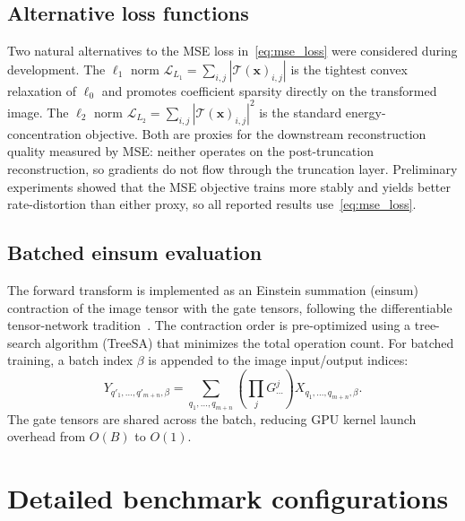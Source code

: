 \documentclass[a4paper, twocolumn]{quantumarticle}
\newcommand{\TT}{\mathcal{T}}
\newcommand{\LL}{\mathcal{L}}
\begin{document}
\subsection{Alternative loss functions}
\label{app:alt_losses}

Two natural alternatives to the MSE loss in~\cref{eq:mse_loss} were considered during development.
The $\ell_1$ norm $\LL_{L_1} = \sum_{i,j} |\TT(\mathbf{x})_{i,j}|$ is the tightest convex relaxation of $\ell_0$ and promotes coefficient sparsity directly on the transformed image.
The $\ell_2$ norm $\LL_{L_2} = \sum_{i,j} |\TT(\mathbf{x})_{i,j}|^2$ is the standard energy-concentration objective.
Both are proxies for the downstream reconstruction quality measured by MSE: neither operates on the post-truncation reconstruction, so gradients do not flow through the truncation layer.
Preliminary experiments showed that the MSE objective trains more stably and yields better rate-distortion than either proxy, so all reported results use~\cref{eq:mse_loss}.

\subsection{Batched einsum evaluation}
\label{app:einsum}

The forward transform is implemented as an Einstein summation (einsum) contraction of the image tensor with the gate tensors, following the differentiable tensor-network tradition~\cite{liao2019differentiable}.
The contraction order is pre-optimized using a tree-search algorithm (TreeSA) that minimizes the total operation count.
For batched training, a batch index $\beta$ is appended to the image input/output indices:
\begin{equation}
  Y_{q'_1, \ldots, q'_{m+n}, \beta} = \sum_{q_1, \ldots, q_{m+n}} \left(\prod_j G^j_{\cdots}\right) X_{q_1, \ldots, q_{m+n}, \beta}.
\end{equation}
The gate tensors are shared across the batch, reducing GPU kernel launch overhead from $O(B)$ to $O(1)$.

\FloatBarrier
\section{Detailed benchmark configurations}
\label{app:benchmark}
\end{document}
